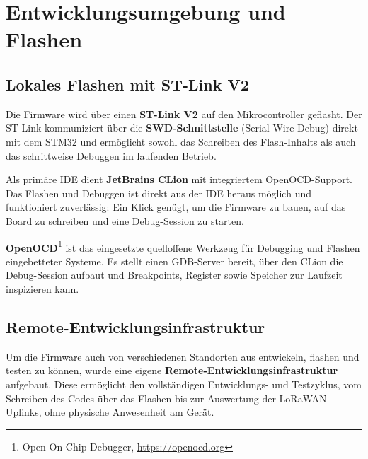 \newpage

\section*{Entwicklungsumgebung und Flashen}

\subsection*{Lokales Flashen mit ST-Link V2}

Die Firmware wird über einen \textbf{ST-Link V2} auf den Mikrocontroller geflasht. Der ST-Link kommuniziert über die \textbf{SWD-Schnittstelle} (Serial Wire Debug) direkt mit dem STM32 und ermöglicht sowohl das Schreiben des Flash-Inhalts als auch das schrittweise Debuggen im laufenden Betrieb.

Als primäre IDE dient \textbf{JetBrains CLion} mit integriertem OpenOCD-Support. Das Flashen und Debuggen ist direkt aus der IDE heraus möglich und funktioniert zuverlässig: Ein Klick genügt, um die Firmware zu bauen, auf das Board zu schreiben und eine Debug-Session zu starten.

\textbf{OpenOCD}\footnote{Open On-Chip Debugger, \url{https://openocd.org}} ist das eingesetzte quelloffene Werkzeug für Debugging und Flashen eingebetteter Systeme. Es stellt einen GDB-Server bereit, über den CLion die Debug-Session aufbaut und Breakpoints, Register sowie Speicher zur Laufzeit inspizieren kann.

\subsection*{Remote-Entwicklungsinfrastruktur}

Um die Firmware auch von verschiedenen Standorten aus entwickeln, flashen und testen zu können, wurde eine eigene \textbf{Remote-Entwicklungsinfrastruktur} aufgebaut. Diese ermöglicht den vollständigen Entwicklungs- und Testzyklus, vom Schreiben des Codes über das Flashen bis zur Auswertung der LoRaWAN-Uplinks, ohne physische Anwesenheit am Gerät.

